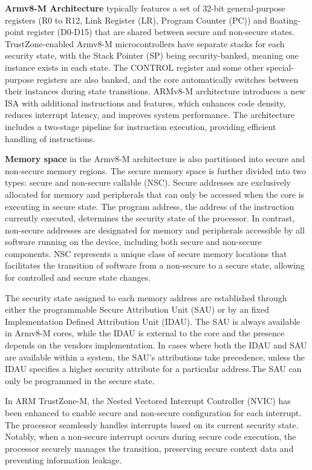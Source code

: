 \textbf{Armv8-M Architecture} typically features a set of 32-bit general-purpose registers (R0 to R12, Link Register (LR), Program Counter (PC)) and floating-point register (D0-D15) that are shared between secure and non-secure states. TrustZone-enabled Armv8-M microcontrollers have separate stacks for each security state, with the Stack Pointer (SP) being security-banked, meaning one instance exists in each state. The CONTROL register and some other special-purpose registers are also banked, and the core automatically switches between their instances during state transitions. ARMv8-M architecture introduces a new ISA with additional instructions and features, which enhances code density, reduces interrupt latency, and improves system performance. The architecture includes a two-stage pipeline for instruction execution, providing efficient handling of instructions.

\textbf{Memory space} in the Armv8-M architecture is also partitioned into secure and non-secure memory regions. The secure memory space is further divided into two types: secure and non-secure callable (\ac{NSC}). Secure addresses are exclusively allocated for memory and peripherals that can only be accessed when the core is executing in secure state. The program address, the address of the instruction currently executed, determines the security state of the processor. In contrast, non-secure addresses are designated for memory and peripherals accessible by all software running on the device, including both secure and non-secure components. \ac{NSC} represents a unique class of secure memory locations that facilitates the transition of software from a non-secure to a secure state, allowing for controlled and secure state changes. 

The security state assigned to each memory address are established through either the programmable Secure Attribution Unit (\ac{SAU}) or by an fixed Implementation Defined Attribution Unit (\ac{IDAU}). The \ac{SAU} is always available in Armv8-M cores, while the \ac{IDAU} is external to the core and the presence depends on the vendors implementation. In cases where both the \ac{IDAU} and \ac{SAU} are available within a system, the \ac{SAU}'s attributions take precedence, unless the \ac{IDAU} specifies a higher security attribute for a particular address.The \ac{SAU} can only be programmed in the secure state. 

In ARM TrustZone-M, the Nested Vectored Interrupt Controller (NVIC) has been enhanced to enable secure and non-secure configuration for each interrupt. The processor seamlessly handles interrupts based on its current security state. Notably, when a non-secure interrupt occurs during secure code execution, the processor securely manages the transition, preserving secure context data and preventing information leakage.

